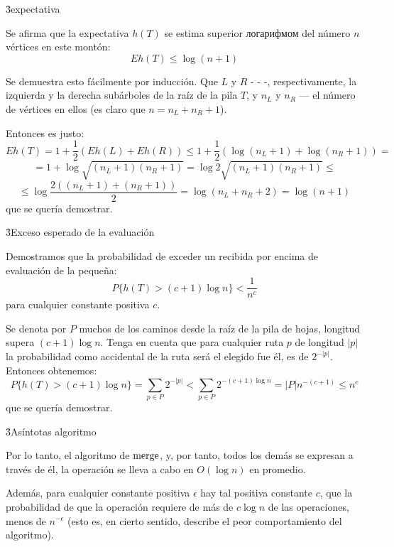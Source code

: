 \h3{expectativa}

Se afirma que la expectativa $h(T)$ se estima superior логарифмом del número $n$ vértices en este montón:
$$ Eh(T) \le \log(n+1) $$

Se demuestra esto fácilmente por inducción. Que $L$ y $R$ - - -, respectivamente, la izquierda y la derecha subárboles de la raíz de la pila $T$, y $n_L$ y $n_R$ --- el número de vértices en ellos (es claro que $n = n_L+n_R+1$).

Entonces es justo:
$$ Eh(T) = 1 + \frac{1}{2}(Eh(L) + Eh(R)) \le 1 + \frac{1}{2}(\log(n_L+1) + \log(n_R+1)) = $$
$$ = 1 + \log \sqrt{ (n_L+1)(n_R+1) } = \log 2 \sqrt{ (n_L+1)(n_R+1) } \le $$
$$ \le \log \frac{ 2 ((n_L+1) + (n_R+1)) }{ 2 } = \log (n_L + n_R + 2) = \log(n+1) $$
que se quería demostrar.

\h3{Exceso esperado de la evaluación}

Demostramos que la probabilidad de exceder un recibida por encima de evaluación de la pequeña:
$$ P\{ h(T) > (c+1) \log n \} < \frac{1}{n^c} $$
para cualquier constante positiva $c$.

Se denota por $P$ muchos de los caminos desde la raíz de la pila de hojas, longitud supera $(c+1) \log n$. Tenga en cuenta que para cualquier ruta $p$ de longitud $|p|$ la probabilidad como accidental de la ruta será el elegido fue él, es de $2^{-|p|}$. Entonces obtenemos:
$$ P\{ h(T) > (c+1) \log n \} = \sum_{p \in P} 2^{-|p|} < \sum_{p \in P} 2^{-(c+1) \log n} = |P| n^{-(c+1)} \le n^{c} $$
que se quería demostrar.

\h3{Asíntotas algoritmo}

Por lo tanto, el algoritmo de $\rm merge$, y, por tanto, todos los demás se expresan a través de él, la operación se lleva a cabo en $O(\log n)$ en promedio.

Además, para cualquier constante positiva $\epsilon$ hay tal positiva constante $c$, que la probabilidad de que la operación requiere de más de $c \log n$ de las operaciones, menos de $n^{-\epsilon}$ (esto es, en cierto sentido, describe el peor comportamiento del algoritmo).